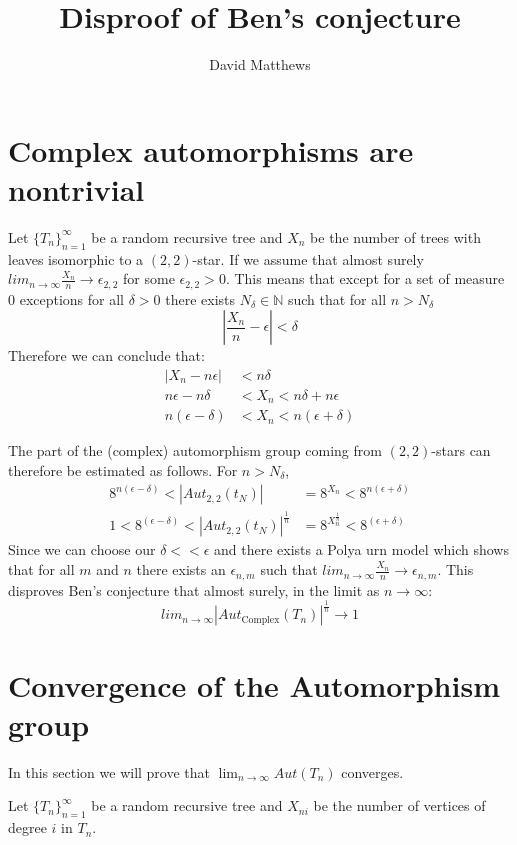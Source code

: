 \documentclass[10pt]{article} %
\title{Disproof of Ben's conjecture}
\author{David Matthews}
\theoremstyle{definition}
\begin{document}
 
 \section{Complex automorphisms are nontrivial}\label{sec:caan}
 
 Let $\{T_n\}_{n=1}^{\infty}$ be a random recursive tree and $X_{n}$ be the number of trees with leaves  isomorphic to a $(2,2)$-star.
 If we assume that almost surely $lim_{n \rightarrow \infty} \frac{X_n}{n} \rightarrow \epsilon_{2,2}$ for some $\epsilon_{2,2}> 0$.  This means that except for a set of measure 0 exceptions for all $\delta > 0$ there exists $N_\delta \in \mathbb{N}$ such that for all $n >N_\delta$ 
 \[ | \frac{X_n}{n}  - \epsilon| < \delta\]
 Therefore we can conclude that:
 \begin{align}
  |X_n  - n\epsilon| &< n \delta \\
 n\epsilon - n\delta  &< X_n < n \delta + n\epsilon \\
n(\epsilon - \delta) &< X_n < n(\epsilon + \delta)  
 \end{align}


 
 The part of the (complex) automorphism group coming from $(2,2)$-stars can therefore be estimated as follows.  For $n >N_\delta$, 
 \begin{align}
 8^{n(\epsilon - \delta)}<|Aut_{2,2}(t_N)| & = 8^{X_n} < 8^{ n(\epsilon + \delta) } \\
 1 < 8^{(\epsilon - \delta)}<|Aut_{2,2}(t_N)|^{\frac{1}{n}} & = 8^{X^{\frac{1}{n}}_n} < 8^{ (\epsilon + \delta) }
 \end{align}
Since we can choose our $\delta << \epsilon$ and there exists a Polya urn model which shows that for all $m$ and $n$ there exists an $\epsilon_{n,m}$ such that $lim_{n \rightarrow \infty} \frac{X_n}{n} \rightarrow \epsilon_{n,m}$. This disproves Ben's conjecture that almost surely, in the limit as $n \rightarrow \infty$: 
\[lim_{n \rightarrow \infty}  |Aut_{\text{Complex}}(T_n)|^{\frac{1}{n}} \rightarrow 1\]
 
\section{Convergence of the Automorphism group}%
 
 In this section we will prove that $\lim_{n \rightarrow \infty} Aut(T_n)$ converges.   
 
 Let $\{T_n\}_{n=1}^{\infty}$ be a random recursive tree and $X_{ni}$ be the number of vertices of degree $i$ in $T_n$.
 
\end{document}
